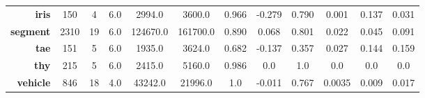 \begin{table}[ht!]
{\begin{tabular}{|r|ccccccccccc|}
    \textbf{iris}          & 150                                    & 4                                       & 6.0                                     & 2994.0                                       & 3600.0                                            & 0.966                                        & -0.279                                & 0.790                            & 0.001                                   & 0.137                                   & 0.031                                    \\
    \textbf{segment}       & 2310                                   & 19                                      & 6.0                                     & 124670.0                                     & 161700.0                                          & 0.890                                        & 0.068                                 & 0.801                            & 0.022                                   & 0.045                                   & 0.091                                    \\
    \textbf{tae}           & 151                                    & 5                                       & 6.0                                     & 1935.0                                       & 3624.0                                            & 0.682                                        & -0.137                                & 0.357                            & 0.027                                   & 0.144                                   & 0.159                                    \\
    \textbf{thy}           & 215                                    & 5                                       & 6.0                                     & 2415.0                                       & 5160.0                                            & 0.986                                        & 0.0                                   & 1.0                              & 0.0                                     & 0.0                                     & 0.0                                      \\
    \textbf{vehicle}       & 846                                    & 18                                      & 4.0                                     & 43242.0                                      & 21996.0                                           & 1.0                                          & -0.011                                & 0.767                            & 0.0035                                  & 0.009                                   & 0.017                                    \\

\end{tabular}}
\end{table}
